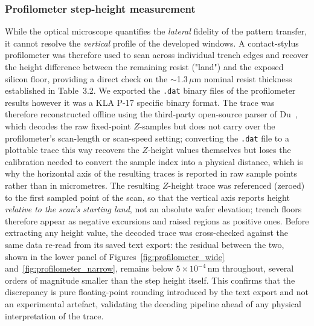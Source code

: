 \subsubsection*{Profilometer step-height measurement}

While the optical microscope quantifies the \emph{lateral} fidelity
of the pattern
transfer, it cannot resolve the \emph{vertical} profile of the
developed windows. A
contact-stylus profilometer was therefore used to scan across individual trench
edges and recover the height difference between the remaining resist
("land") and
the exposed silicon floor, providing a direct check on the
$\sim$1.3\,$\mu$m nominal
resist thickness established in Table~3.2. We exported the \texttt{.dat} binary
files of the profilometer results however it was a KLA P-17 specific
binary format. The trace was therefore reconstructed offline using
the third-party open-source parser of Du~\cite{P7Dat2Txt}, which decodes the raw
fixed-point $Z$-samples but does not carry over the profilometer's
scan-length or
scan-speed setting; converting the \texttt{.dat} file to a plottable
trace this way
recovers the $Z$-height values themselves but loses the calibration needed to
convert the sample index into a physical distance, which is why the horizontal
axis of the resulting traces is reported in raw sample points rather than in
micrometres. The resulting $Z$-height trace was referenced (zeroed) to the first
sampled point of the scan, so that the vertical axis reports height
\emph{relative
to the scan's starting land},
not an absolute wafer elevation; trench floors therefore appear as negative
excursions and raised regions as positive ones. Before extracting any
height value,
the decoded trace was cross-checked against the same data re-read from its saved
text export: the residual between the two, shown in the lower panel of
Figures~\ref{fig:profilometer_wide} and~\ref{fig:profilometer_narrow},
remains below $5\times10^{-4}$\,nm throughout, several orders of
magnitude smaller
than the step height itself. This confirms that the discrepancy is pure
floating-point rounding introduced by the text export and not an experimental
artefact, validating the decoding pipeline ahead of any physical
interpretation of
the trace.

